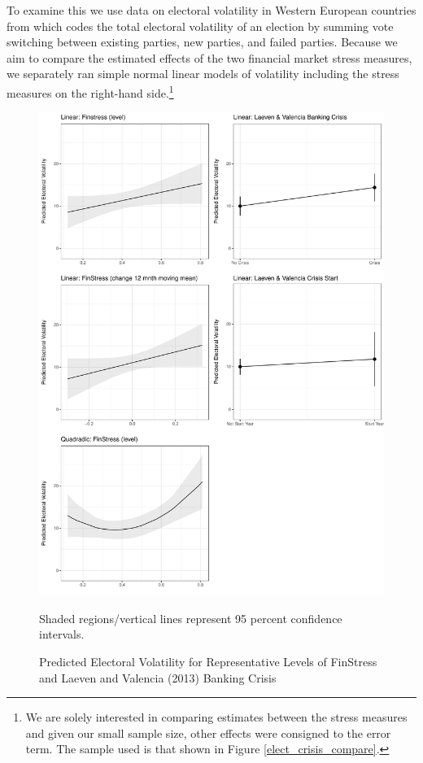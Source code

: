 \documentclass[]{article}
\begin{document}
To examine this we use data on electoral volatility in Western European countries from \cite{Emanuele2015} which codes the total electoral volatility of an election by summing vote switching between existing parties, new parties, and failed parties. Because we aim to compare the estimated effects of the two financial market stress measures, we separately ran simple normal linear models of volatility including the stress measures on the right-hand side.\footnote{We are solely interested in comparing estimates between the stress measures and given our small sample size, other effects were consigned to the error term. The sample used is that shown in Figure \ref{elect_crisis_compare}.}

\begin{figure}
	\caption{Predicted Electoral Volatility for Representative Levels of FinStress and Laeven and Valencia (2013) Banking Crisis}
    \label{pred_vol}
    \begin{center}
		\includegraphics[scale=0.5]{figures/elect_vol_predict.pdf}
	\end{center}
    {\scriptsize{
    Shaded regions/vertical lines represent 95 percent confidence intervals.
    }}
\end{figure}
\end{document}
